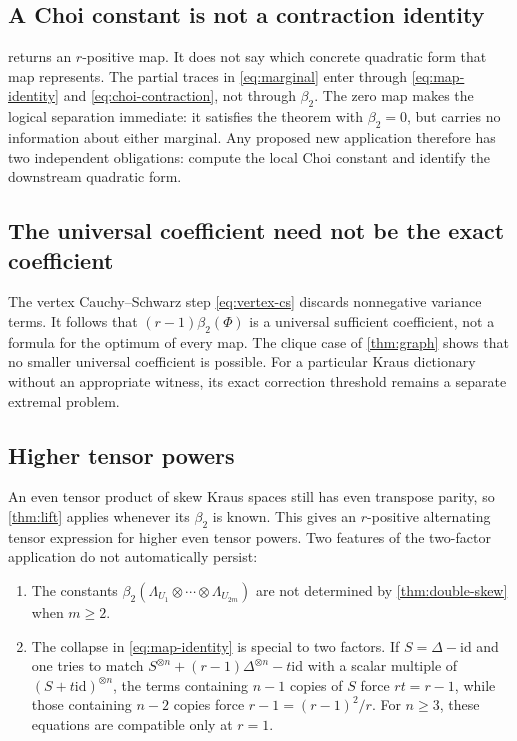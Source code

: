 \documentclass[11pt,reqno]{amsart}
\theoremstyle{remark}
\newcommand{\id}{\mathrm{id}}
\begin{document}
\subsection{A Choi constant is not a contraction identity}

 returns an $r$-positive map.  It does not say which concrete
quadratic form that map represents.  The partial traces in
\cref{eq:marginal} enter through \cref{eq:map-identity} and
\cref{eq:choi-contraction}, not through $\beta_2$.  The zero map makes the
logical separation immediate: it satisfies the theorem with
$\beta_2=0$, but carries no information about either marginal.  Any proposed
new application therefore has two independent obligations:
compute the local Choi constant and identify the downstream quadratic form.

\subsection{The universal coefficient need not be the exact coefficient}

The vertex Cauchy--Schwarz step \cref{eq:vertex-cs} discards nonnegative
variance terms.  It follows that $(r-1)\beta_2(\Phi)$ is a universal
sufficient coefficient, not a formula for the optimum of every map.  The
clique case of \cref{thm:graph} shows that no smaller universal coefficient
is possible.  For a particular Kraus dictionary without an appropriate
witness, its exact correction threshold remains a separate extremal problem.

\subsection{Higher tensor powers}

An even tensor product of skew Kraus spaces still has even transpose parity,
so \cref{thm:lift} applies whenever its $\beta_2$ is known.  This gives
an $r$-positive alternating tensor expression for higher even tensor powers.  Two
features of the two-factor application do not automatically persist:

\begin{enumerate}
\item The constants
$\beta_2(\Lambda_{U_1}\otimes\cdots\otimes\Lambda_{U_{2m}})$ are not
determined by \cref{thm:double-skew} when $m\ge2$.
\item The collapse in \cref{eq:map-identity} is special to two factors.  If
$S=\Delta-\id$ and one tries to match
$S^{\otimes n}+(r-1)\Delta^{\otimes n}-t\id$ with a scalar multiple of
$(S+t\id)^{\otimes n}$, the terms containing $n-1$ copies of $S$ force
$rt=r-1$, while those containing $n-2$ copies force
$r-1=(r-1)^2/r$.  For $n\ge3$, these equations are compatible only at
$r=1$.
\end{enumerate}
\end{document}
